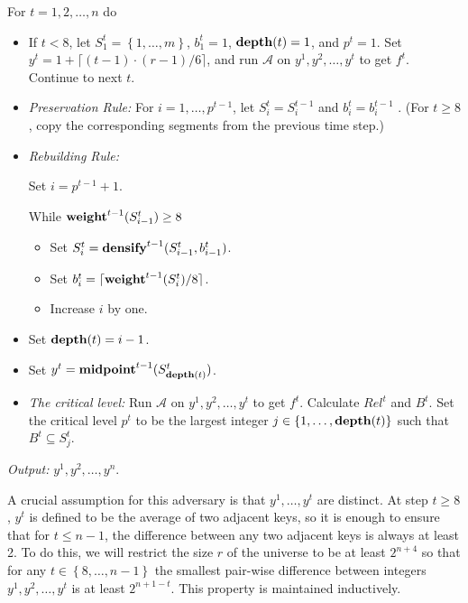 \documentclass[11pt]{article}
\newcommand{\A}{\mathcal{A}}
\newcommand{\natInt}[2]{ \left\{ #1, \dotsc, #2 \right\} }
\newcommand{\weight}{{\rm {\bf weight}}}
\newcommand{\midp}{{\rm {\bf midpoint}}}
\newcommand{\depth}{{\rm {\bf depth}}}
\newcommand{\densify}{{\rm {\bf densify}}}
\begin{document}
\smallskip\noindent For $t=1,2,\dotsc,n$ do
\begin{itemize}
\item
If $t < 8$, let $S^t_1 = \natInt{1}{m}$, $b^t_1=1$, $\depth(t)=1$, and $p^{t}=1$.
Set $y^t = 1 + \lceil (t-1) \cdot (r-1)/6 \rceil$, and run $\A$ on $y^1,y^2,\dotsc,y^t$ to get $f^t$.
Continue to next $t$.

\item
\emph{Preservation Rule:}
For $i=1,\dotsc,p^{t-1}$, let $S^t_i=S^{t-1}_{i}$ and $b^t_i=b^{t-1}_i$ .
(For $t\ge 8$, copy the corresponding segments from the previous time step.)

\item
\emph{Rebuilding Rule:}

Set $i=p^{t-1}+1$.

While $\weight^{t-1}(S^t_{i-1}) \ge 8$

\begin{itemize}
\item Set $S^t_i = \densify^{t-1}(S^t_{i-1},b^t_{i-1})$.
\item Set $b^t_i = \lceil \weight^{t-1}(S^t_i)/8 \rceil$.
\item Increase $i$ by one.
\end{itemize}

\item
Set $\depth(t)=i-1$.

\item
Set $y^t = \midp^{t-1}(S^t_{\depth(t)})$.

\item
\emph{The critical level:}
Run $\A$ on $y^1,y^2,\dotsc,y^t$ to get $f^t$. Calculate $Rel^t$ and $B^t$.
Set the critical level $p^{t}$ to be the largest integer $j \in \natInt{1}{\depth(t)}$ such that $B^{t} \subseteq S^{t}_j$.

\end{itemize}

\noindent\emph{Output:} $y^1,y^2,\dotsc,y^n$.


\medskip

A crucial assumption for this adversary is that $y^1,\ldots,y^t$ are distinct.  At step $t \geq 8$, $y^t$ is defined
to be the average of two adjacent keys, so it is enough to ensure that for $t \leq n-1$, 
the difference between any two
adjacent keys is always at least 2.  To do this, we will restrict the size $r$ of the universe to be at least
$2^{n+4}$ so that for any $t \in \natInt{8}{n-1}$ the smallest pair-wise difference between integers 
$y^1,y^2,\dotsc,y^t$ is
at least $2^{n+1-t}$. This property is maintained inductively.
\end{document}
